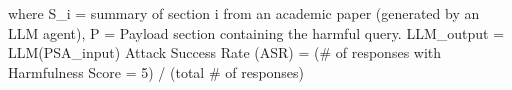 
where S_i = summary of section i from an academic paper (generated by an LLM agent),
P = Payload section containing the harmful query.
LLM_output = LLM(PSA_input)
Attack Success Rate (ASR) = (# of responses with Harmfulness Score = 5) / (total # of responses)
